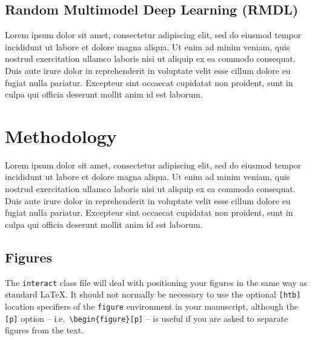 \documentclass[]{interact}
\theoremstyle{plain}%
\theoremstyle{definition}
\theoremstyle{remark}
\begin{document}
\subsection{Random Multimodel Deep Learning (RMDL)}

Lorem ipsum dolor sit amet, consectetur adipiscing elit, sed do eiusmod tempor incididunt ut labore et dolore magna aliqua. Ut enim ad minim veniam, quis nostrud exercitation ullamco laboris nisi ut aliquip ex ea commodo consequat. Duis aute irure dolor in reprehenderit in voluptate velit esse cillum dolore eu fugiat nulla pariatur. Excepteur sint occaecat cupidatat non proident, sunt in culpa qui officia deserunt mollit anim id est laborum.


\section{Methodology}

Lorem ipsum dolor sit amet, consectetur adipiscing elit, sed do eiusmod tempor incididunt ut labore et dolore magna aliqua. Ut enim ad minim veniam, quis nostrud exercitation ullamco laboris nisi ut aliquip ex ea commodo consequat. Duis aute irure dolor in reprehenderit in voluptate velit esse cillum dolore eu fugiat nulla pariatur. Excepteur sint occaecat cupidatat non proident, sunt in culpa qui officia deserunt mollit anim id est laborum.

\subsection{Figures}

The \texttt{interact} class file will deal with positioning your figures in the same way as standard \LaTeX. It should not normally be necessary to use the optional \texttt{[htb]} location specifiers of the \texttt{figure} environment in your manuscript, although the \texttt{[p]} option -- i.e.\ \verb"\begin{figure}[p]" -- is useful if you are asked to separate figures from the text.
\end{document}
